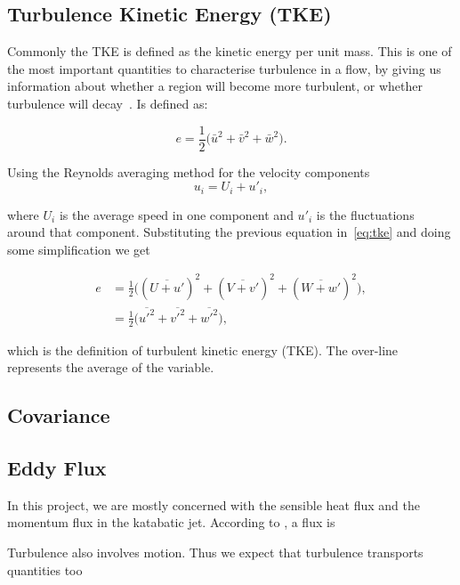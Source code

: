 \documentclass[a4paper,12pt]{article}
\begin{document}
\subsection{Turbulence Kinetic Energy (TKE)}
Commonly the TKE is defined as the kinetic energy per unit mass. This is one of the most important quantities to characterise turbulence in a flow, by giving us information about whether a region will become more turbulent, or whether turbulence will decay~\citep{stull2012introduction}.  Is defined as:

\begin{equation}
    e = \frac{1}{2} \big(\bar{u}^2 + \bar{v}^2 + \bar{w}^2\big). 
    \label{eq:tke}
\end{equation}

 Using the Reynolds averaging method for the velocity components
\begin{equation}
   u_i = U_i + u'_i,
   \label{eq:Re_avg}
\end{equation}


\noindent where $U_i$ is the average speed in one component and $u'_i$ is the fluctuations around that component. Substituting the previous equation in~\ref{eq:tke} and doing some simplification we get

\begin{subequations}
  \begin{align}
    e &= \frac{1}{2} \big((\overline{U + u'})^2 + (\overline{V + v'})^2 + (\overline{W + w'})^2 \big), \\
    &= \frac{1}{2} \big(\overline{u'^2} + \overline{v'^2} + \overline{w'^2}\big),
  \end{align}
  \label{eq:tke_2}
\end{subequations}

\noindent which is the definition of turbulent kinetic energy (TKE). The over-line represents the average of the variable. 

\subsection{Covariance}


\subsection{Eddy Flux}
In this project, we are mostly concerned with the sensible heat flux and the momentum flux in the katabatic jet. According to \cite{stull2012introduction}, a flux is 

Turbulence also involves motion. Thus we expect that turbulence transports
quantities too
\end{document}
